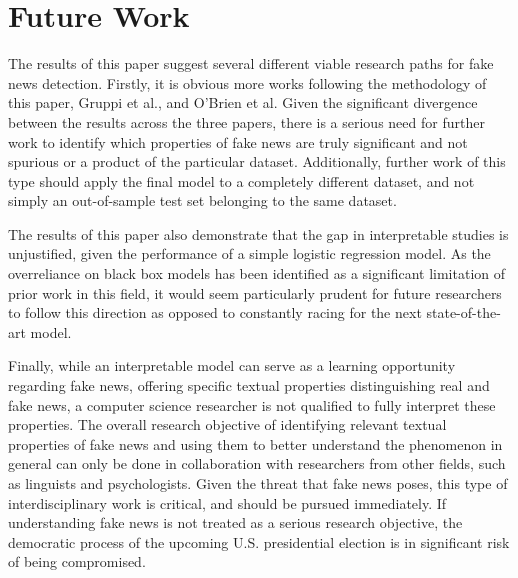 \documentclass[../thesis.tex]{subfiles}
\begin{document}
\section{Future Work}

The results of this paper suggest several different viable research paths for fake news detection. Firstly, it is obvious more works following the methodology of this paper, Gruppi et al., and O'Brien et al. Given the significant divergence between the results across the three papers, there is a serious need for further work to identify which properties of fake news are truly significant and not spurious or a product of the particular dataset. Additionally, further work of this type should apply the final model to a completely different dataset, and not simply an out-of-sample test set belonging to the same dataset.

The results of this paper also demonstrate that the gap in interpretable studies is unjustified, given the performance of a simple logistic regression model. As the overreliance on black box models has been identified as a significant limitation of prior work in this field, it would seem particularly prudent for future researchers to follow this direction as opposed to constantly racing for the next state-of-the-art model.

Finally, while an interpretable model can serve as a learning opportunity regarding fake news, offering specific textual properties distinguishing real and fake news, a computer science researcher is not qualified to fully interpret these properties. The overall research objective of identifying relevant textual properties of fake news and using them to better understand the phenomenon in general can only be done in collaboration with researchers from other fields, such as linguists and psychologists. Given the threat that fake news poses, this type of interdisciplinary work is critical, and should be pursued immediately. If understanding fake news is not treated as a serious research objective, the democratic process of the upcoming U.S. presidential election is in significant risk of being compromised.
\end{document}
